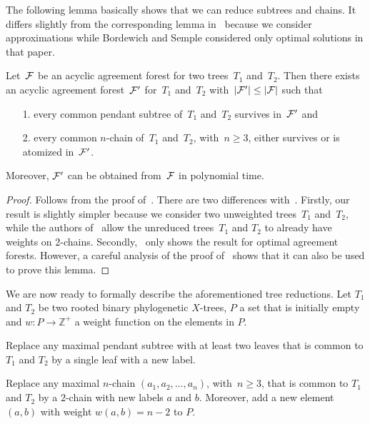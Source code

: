 The following lemma basically shows that we can reduce subtrees and chains. It differs slightly from the corresponding lemma in~\cite{bordewich07b} because we consider approximations while Bordewich and Semple considered only optimal solutions in that paper.

\begin{lemma}\label{lem:survives}\cite[Lemma 3.1]{bordewich07b}
Let~${\mathcal F}$ be an acyclic agreement forest for two trees~$T_1$ and~$T_2$. Then there exists an acyclic agreement forest~${\mathcal F}'$ for~$T_1$ and~$T_2$ with~$|{\mathcal F}'|\leq |{\mathcal F}|$ such that
\begin{itemize}
\item[1.] every common pendant subtree of~$T_1$ and~$T_2$ survives in~${\mathcal F}'$ and
\item[2.] every common $n$-chain of~$T_1$ and~$T_2$, with~$n\geq 3$, either survives or is atomized in~${\mathcal F}'$.
\end{itemize}
Moreover, ${\mathcal F}'$ can be obtained from~${\mathcal F}$ in polynomial time.
\end{lemma}
\begin{proof}
Follows from the proof of~\cite[Lemma 3.1]{bordewich07b}. There are two differences with~\cite[Lemma 3.1]{bordewich07b}. Firstly, our result is slightly simpler because we consider two unweighted trees~$T_1$ and~$T_2$, while the authors of~\cite{bordewich07b} allow the unreduced trees~$T_1$ and $T_2$ to already have weights on 2-chains. Secondly,~\cite[Lemma 3.1]{bordewich07b} only shows the result for optimal agreement forests. However, a careful analysis of the proof of~\cite[Lemma 3.1]{bordewich07b} shows that it can also be used to prove this lemma.
\end{proof}

We are now ready to formally describe the aforementioned tree reductions. Let $T_1$ and $T_2$ be two rooted binary phylogenetic $X$-trees, $P$ a set that is initially empty and $w:P\rightarrow\mathbb{Z}^+$ a weight function on the elements in $P$.

 Replace any maximal pendant subtree with at least two leaves that is common to $T_1$ and $T_2$ by a single leaf with a new label.

 Replace any maximal $n$-chain $(a_1,a_2,\ldots,a_n)$, with~$n\geq 3$, that is common to $T_1$ and $T_2$ by a $2$-chain with new labels $a$ and $b$. Moreover, add a new element $(a,b)$ with weight $w(a,b)=n-2$ to $P$.

